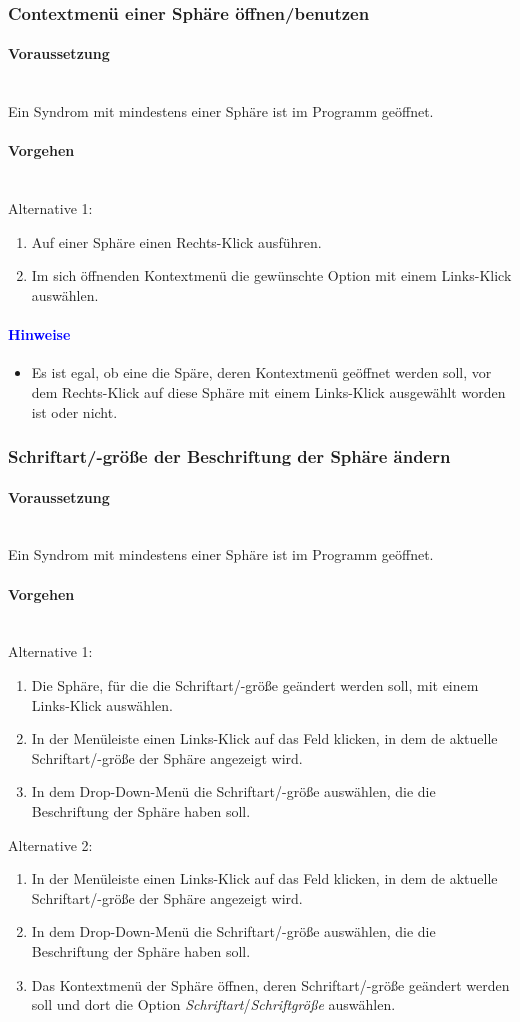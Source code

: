 \documentclass[enabledeprecatedfontcommands,fontsize=11pt,paper=a4,twoside]{scrartcl}
\newcommand*{\hint}{\paragraph{\textcolor{blue}{Hinweise}}}
\newcommand*{\condition}{\paragraph{Voraussetzung}$\;$ \vspace{0.2cm}\\}
\newcommand*{\actions}{\paragraph{Vorgehen} $\;$\vspace{0.2cm}\\}
\begin{document}
		\subsubsection{Contextmenü einer Sphäre öffnen/benutzen}
				\condition 	
		Ein Syndrom mit mindestens einer Sphäre ist im Programm geöffnet. 
		\actions  
		Alternative 1:
		\begin{enumerate}
			\item Auf einer Sphäre einen Rechts-Klick ausführen.
			\item Im sich öffnenden Kontextmenü die gewünschte Option mit einem Links-Klick auswählen.
		\end{enumerate}
		\hint
		\begin{itemize}
			\item Es ist egal, ob eine die Späre, deren Kontextmenü geöffnet werden soll, vor dem Rechts-Klick auf diese Sphäre mit einem Links-Klick ausgewählt worden ist oder nicht.
		\end{itemize}
		\subsubsection{Schriftart/-größe der Beschriftung der Sphäre ändern}
				\condition 	
		Ein Syndrom mit mindestens einer Sphäre ist im Programm geöffnet. 
		\actions  
		Alternative 1:
		\begin{enumerate}
			\item Die Sphäre, für die die Schriftart/-größe geändert werden soll, mit einem Links-Klick auswählen.
			\item In der Menüleiste einen Links-Klick auf das Feld klicken, in dem de aktuelle Schriftart/-größe der Sphäre angezeigt wird.
			\item In dem Drop-Down-Menü die Schriftart/-größe auswählen, die die Beschriftung der Sphäre haben soll.
		\end{enumerate}
		Alternative 2:
			\begin{enumerate}
			\item In der Menüleiste einen Links-Klick auf das Feld klicken, in dem de aktuelle Schriftart/-größe der Sphäre angezeigt wird.
			\item In dem Drop-Down-Menü die Schriftart/-größe auswählen, die die Beschriftung der Sphäre haben soll.
			\item Das Kontextmenü der Sphäre öffnen, deren Schriftart/-größe geändert werden soll und dort die Option \textit{Schriftart}/\textit{Schriftgröße} auswählen.
		\end{enumerate}
\end{document}
